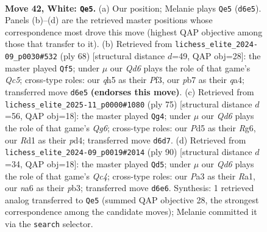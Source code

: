 \documentclass[11pt]{article}
\begin{document}
\clearpage

\begin{figure}[p]\centering
\begin{subfigure}{0.46\textwidth}\centering
\resizebox{\linewidth}{!}{%
\newchessgame
\chessboard[
  setfen={r5k1/pp6/n2Q4/2pP1p1q/8/P5P1/1P3K2/2RR4 w - - 2 42},
  showmover=false,
  pgfstyle=straightmove, color=movearrow, markmove={d6-e5}
]}
\caption{}
\end{subfigure}\hfill
\begin{subfigure}{0.46\textwidth}\centering
\resizebox{\linewidth}{!}{%
\newchessgame
\chessboard[
  setfen={r6k/5p2/5p1p/p1Q5/qp6/4PP1P/6P1/2R4K w - - 0 35},
  showmover=false,
  pgfstyle=straightmove, color=movearrow, markmove={c5-f5}
]}
\caption{}
\end{subfigure}
\\[4pt]
\begin{subfigure}{0.46\textwidth}\centering
\resizebox{\linewidth}{!}{%
\newchessgame
\chessboard[
  setfen={8/1p4pk/pP4rp/P7/3P1n2/5Nq1/2R3P1/5Q1K b - - 4 38},
  showmover=false,
  pgfstyle=straightmove, color=movearrow, markmove={g3-g4}
]}
\caption{}
\end{subfigure}\hfill
\begin{subfigure}{0.46\textwidth}\centering
\resizebox{\linewidth}{!}{%
\newchessgame
\chessboard[
  setfen={8/q3k3/6p1/p4pP1/P1QRn3/1p2r3/6P1/R6K w - - 0 46},
  showmover=false,
  pgfstyle=straightmove, color=movearrow, markmove={c4-d5}
]}
\caption{}
\end{subfigure}
\caption{\textbf{Move 42, White: \texttt{Qe5}.} (a) Our position; Melanie plays \texttt{Qe5} (\texttt{d6e5}). Panels (b)--(d) are the retrieved master positions whose correspondence most drove this move (highest QAP objective among those that transfer to it). (b) Retrieved from \texttt{lichess\_elite\_2024-09\_p0030\#532} (ply 68) [structural distance $d$=49, QAP obj=28]: the master played \texttt{Qf5}; under $\mu$ our \emph{Qd6} plays the role of that game's \emph{Qc5}; cross-type roles: our \emph{q}h5 as their \emph{P}f3, our \emph{p}b7 as their \emph{q}a4; transferred move \texttt{d6e5} \textbf{(endorses this move)}. (c) Retrieved from \texttt{lichess\_elite\_2025-11\_p0000\#1080} (ply 75) [structural distance $d$=56, QAP obj=18]: the master played \texttt{Qg4}; under $\mu$ our \emph{Qd6} plays the role of that game's \emph{Qg6}; cross-type roles: our \emph{P}d5 as their \emph{R}g6, our \emph{R}d1 as their \emph{p}d4; transferred move \texttt{d6d7}. (d) Retrieved from \texttt{lichess\_elite\_2024-09\_p0019\#2014} (ply 90) [structural distance $d$=34, QAP obj=18]: the master played \texttt{Qd5}; under $\mu$ our \emph{Qd6} plays the role of that game's \emph{Qc4}; cross-type roles: our \emph{P}a3 as their \emph{R}a1, our \emph{n}a6 as their \emph{p}b3; transferred move \texttt{d6e6}. Synthesis: 1 retrieved analog transferred to \texttt{Qe5} (summed QAP objective 28, the strongest correspondence among the candidate moves); Melanie committed it via the \texttt{search} selector.}
\label{fig:thought-m82}
\end{figure}
\end{document}

